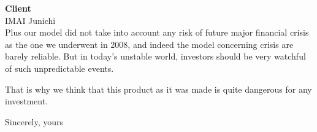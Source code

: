 \documentclass[a4paper,10pt]{letter}
\begin{document}
\begin{letter}{\textbf{Client}\\ 
               IMAI Junichi\\}
Plus our model did not take into account any risk of future major financial crisis as the one we underwent in 2008, and indeed the model concerning crisis are barely reliable. But in today's unstable world, investors should be very watchful of such unpredictable events.


That is why we think that this product as it was made is quite dangerous for any investment.

\closing{Sincerely, yours}



\end{letter}
\end{document}
